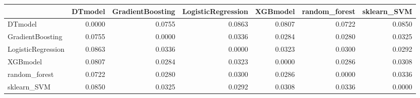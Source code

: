 \begin{tabular}{lrrrrrr}
\toprule
 & DTmodel & GradientBoosting & LogisticRegression & XGBmodel & random_forest & sklearn_SVM \\
\midrule
DTmodel & 0.0000 & 0.0755 & 0.0863 & 0.0807 & 0.0722 & 0.0850 \\
GradientBoosting & 0.0755 & 0.0000 & 0.0336 & 0.0284 & 0.0280 & 0.0325 \\
LogisticRegression & 0.0863 & 0.0336 & 0.0000 & 0.0323 & 0.0300 & 0.0292 \\
XGBmodel & 0.0807 & 0.0284 & 0.0323 & 0.0000 & 0.0286 & 0.0308 \\
random_forest & 0.0722 & 0.0280 & 0.0300 & 0.0286 & 0.0000 & 0.0336 \\
sklearn_SVM & 0.0850 & 0.0325 & 0.0292 & 0.0308 & 0.0336 & 0.0000 \\
\bottomrule
\end{tabular}
